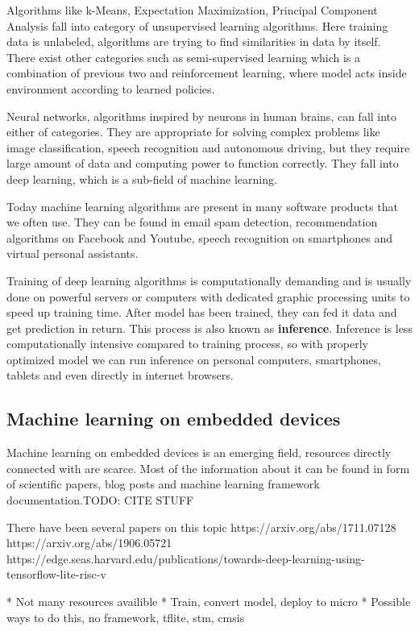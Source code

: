 Algorithms like k-Means, Expectation Maximization, Principal Component Analysis fall into category of unsupervised learning algorithms.
Here training data is unlabeled, algorithms are trying to find similarities in data by itself\cite{geron}.
There exist other categories such as semi-supervised learning which is a combination of previous two and reinforcement learning, where model acts inside environment according to learned policies\cite{geron}.

Neural networks, algorithms inspired by neurons in human brains\cite{geron}\cite{cs231n}, can fall into either of categories. 
They are appropriate for solving complex problems like image classification, speech recognition and autonomous driving, but they require large amount of data and computing power to function correctly.
They fall into deep learning, which is a sub-field of machine learning.

Today machine learning algorithms are present in many software products that we often use. 
They can be found in email spam detection, recommendation algorithms on Facebook and Youtube, speech recognition on smartphones and virtual personal assistants. 

Training of deep learning algorithms is computationally demanding and is usually done on powerful servers or computers with dedicated graphic processing units to speed up training time.
After model has been trained, they can fed it data and get prediction in return. 
This process is also known as \textbf{inference}.
Inference is less computationally intensive compared to training process, so with properly optimized model we can run inference on personal computers, smartphones, tablets and even directly in internet browsers.


\subsection{ Machine learning on embedded devices}

Machine learning on embedded devices is an emerging field, resources directly connected with are scarce.
Most of the information about it can be found in form of scientific papers, blog posts and machine learning framework documentation.TODO: CITE STUFF


There have been several papers on this topic
https://arxiv.org/abs/1711.07128
https://arxiv.org/abs/1906.05721
https://edge.seas.harvard.edu/publications/towards-deep-learning-using-tensorflow-lite-risc-v

* Not many resources availible
* Train, convert model, deploy to micro
* Possible ways to do this, no framework, tflite, stm, cmsis


